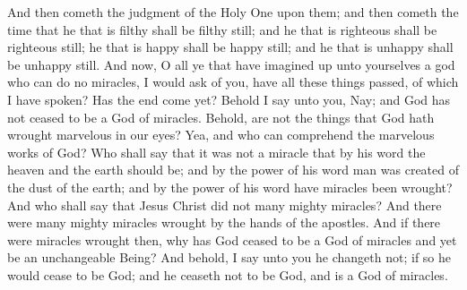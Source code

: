 And then cometh the judgment of the Holy One upon them; and then cometh the time that he that is filthy shall be filthy still; and he that is righteous shall be righteous still; he that is happy shall be happy still; and he that is unhappy shall be unhappy still.
\bverse \iffalse And now, O all ye that have imagined up unto yourselves a god who can do no miracles, I would ask of you, have all these things passed, of which I have spoken? Has the end come yet? Behold I say unto you, Nay; and God has not ceased to be a God of miracles. \fi
And now, O all ye that have imagined up unto yourselves a god who can do no miracles, I would ask of you, have all these things passed, of which I have spoken? Has the end come yet? Behold I say unto you, Nay; and God has not ceased to be a God of miracles.
\bverse \iffalse Behold, are not the things that God hath wrought marvelous in our eyes? Yea, and who can comprehend the marvelous works of God? \fi
Behold, are not the things that God hath wrought marvelous in our eyes? Yea, and who can comprehend the marvelous works of God?
\bverse \iffalse Who shall say that it was not a miracle that by his word the heaven and the earth should be; and by the power of his word man was created of the dust of the earth; and by the power of his word have miracles been wrought? \fi
Who shall say that it was not a miracle that by his word the heaven and the earth should be; and by the power of his word man was created of the dust of the earth; and by the power of his word have miracles been wrought?
\bverse \iffalse And who shall say that Jesus Christ did not many mighty miracles? And there were many mighty miracles wrought by the hands of the apostles. \fi
And who shall say that Jesus Christ did not many mighty miracles? And there were many mighty miracles wrought by the hands of the apostles.
\bverse \iffalse And if there were miracles wrought then, why has God ceased to be a God of miracles and yet be an unchangeable Being?  And behold, I say unto you he changeth not; if so he would cease to be God; and he ceaseth not to be God, and is a God of miracles. \fi
And if there were miracles wrought then, why has God ceased to be a God of miracles and yet be an unchangeable Being?  And behold, I say unto you he changeth not; if so he would cease to be God; and he ceaseth not to be God, and is a God of miracles.
\bverse \iffalse And the reason why he ceaseth to do miracles among the children of men is because that they dwindle in unbelief, and depart from the right way, and know not the God in whom they should trust. \fi
